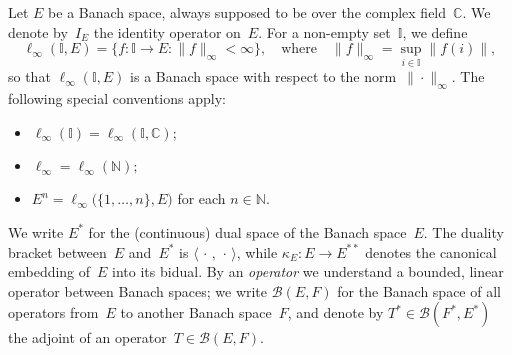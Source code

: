 \documentclass[12pt]{amsart}
\theoremstyle{definition}
\numberwithin{equation}{section}
\begin{document}
Let $E$ be a Banach space, always supposed to be over the complex
field~$\mathbb{C}$. We denote by~$I_E$ the identity operator on~$E$.
For a non-empty set~$\mathbb{I}$, we define
\[ \ell_\infty(\mathbb{I},E) = \{ f\colon\mathbb{I}\to E : \|
f\|_\infty<\infty\},\quad\text{where}\quad \|f\|_\infty =
\sup_{i\in\mathbb{I}}\|f(i)\|, \] so that $\ell_\infty(\mathbb{I},E)$
is a Banach space with respect to the norm~$\|\cdot\|_\infty$.  The
following special conventions apply:
\begin{itemize}
\item $\ell_\infty(\mathbb{I}) = \ell_\infty(\mathbb{I},{\ensuremath{\mathbb{C}}})$;
\item $\ell_\infty = \ell_\infty({\ensuremath{\mathbb{N}}});$
\item $E^n = \ell_\infty\bigl(\{1,\ldots,n\},E\bigr)$ for each
  $n\in{\ensuremath{\mathbb{N}}}$.
\end{itemize}

We write $E^*$ for the (continuous) dual space of the Banach
space~$E$. The duality bracket between~$E$ and~$E^*$ is
$\langle\,\cdot\,,\,\cdot\,\rangle$, while $\kappa_E\colon E\to
E^{**}$ denotes the canonical embedding of~$E$ into its bidual. By an
\emph{operator} we understand a bounded, linear operator between
Banach spaces; we write $\mathscr{B}(E,F)$ for the Banach space of all
operators from~$E$ to another Banach space~$F$, and denote by $T^*\in
\mathscr{B}(F^*,E^*)$ the adjoint of an
operator~$T\in\mathscr{B}(E,F)$.
\end{document}
